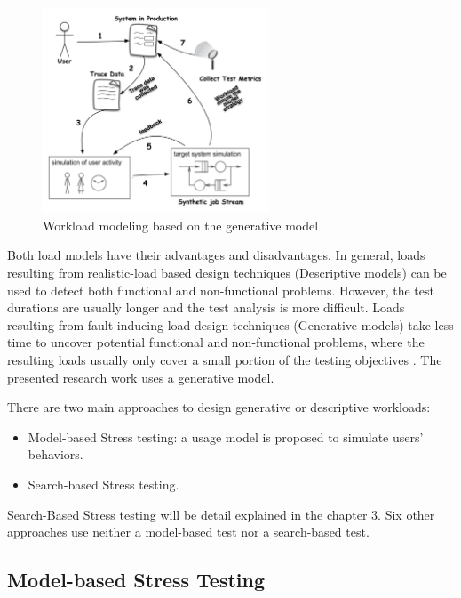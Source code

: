 \documentclass{report}
\begin{document}
\begin{figure}[h]
\centering
\includegraphics[width=0.6\textwidth]{./images/workloadmodel2300dpi.png}
\caption{Workload modeling based on the generative model \cite{DiLucca2006}}
\label{fig:generativemodel}

\end{figure}


Both load models have their advantages and disadvantages. In general, loads resulting from realistic-load based design techniques (Descriptive models) can be used to detect both functional and non-functional problems. However, the test durations are usually longer and the test analysis is more difficult. Loads resulting from fault-inducing load design techniques (Generative models) take less time to uncover potential functional and non-functional problems, where the resulting loads usually only cover a small portion of the testing objectives \cite{Jiang2010}. The presented research work uses a generative model.


There are two main approaches to design generative or descriptive workloads:

\begin{itemize}
\item Model-based Stress testing: a usage model is proposed to simulate users’ behaviors.
\item Search-based Stress testing.
\end{itemize}


Search-Based Stress testing will be detail explained in the chapter 3. Six other approaches use neither a model-based test nor a search-based test.

\subsection{Model-based Stress Testing}
\end{document}
